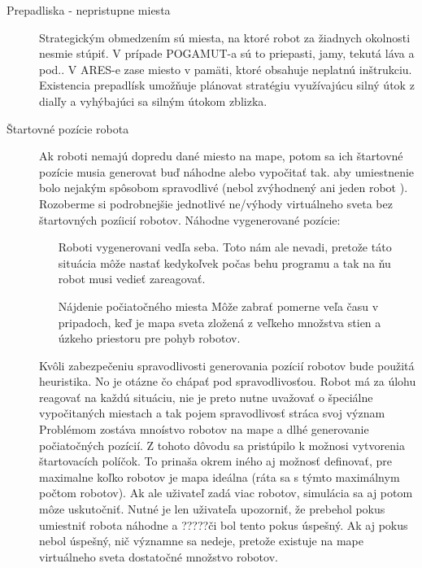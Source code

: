 \begin{description}
\newline
\item[Prepadliska - nepristupne miesta] \hfill
Strategickým obmedzením sú miesta, na ktoré robot za žiadnych okolnosti nesmie stúpiť. V prípade POGAMUT-a sú to priepasti, jamy, tekutá láva a pod.. V ARES-e zase miesto v pamäti, ktoré obsahuje neplatnú inštrukciu. Existencia prepadlísk umožňuje plánovat stratégiu využívajúcu silný útok z dialľy a vyhýbajúci sa silným útokom zblizka. 
\newline
\item[Štartovné pozície robota]\hfill
\newline
Ak roboti nemajú dopredu dané miesto na  mape, potom sa ich štartovné pozície musia generovat buď náhodne alebo vypočitať tak. aby umiestnenie bolo nejakým spôsobom spravodlivé (nebol zvýhodnený ani jeden robot ). Rozoberme si podrobnejšie jednotlivé ne/výhody virtuálneho sveta bez štartovných pozíicií robotov. Náhodne vygenerované pozície:
\begin{itemize}
\item[Roboti vygenerovani vedľa seba.] Toto nám ale nevadi, pretože táto situácia môže nastať kedykoľvek počas behu programu a tak na ňu robot musi vedieť zareagovať.
\item[Nájdenie počiatočného miesta] Môže zabrať pomerne veľa času v pripadoch, keď je mapa sveta zložená z veľkeho množstva stien a úzkeho priestoru pre pohyb robotov.
\end{itemize}
Kvôli zabezpečeniu spravodlivosti generovania pozícií robotov bude použitá heuristika. No je otázne čo chápať pod spravodlivosťou. Robot má za úlohu reagovať na každú situáciu, nie je preto nutne uvažovať o špeciálne vypočitaných miestach a tak pojem spravodlivosť stráca svoj význam\\
Problémom zostáva mnoístvo robotov na  mape a dlhé generovanie počiatočných pozícií. Z tohoto dôvodu sa pristúpilo k možnosi vytvorenia štartovacích políčok. To prinaša okrem iného aj možnosť definovať, pre maximalne koľko robotov je mapa ideálna (ráta sa s týmto maximálnym počtom robotov).  Ak ale uživateľ zadá viac robotov, simulácia sa aj potom môze uskutočniť.  Nutné je len uživateľa upozorniť, že prebehol pokus umiestniť robota náhodne a ?????či bol tento pokus úspešný. Ak aj pokus nebol úspešný, nič významne sa nedeje, pretože existuje na mape virtuálneho sveta dostatočné množstvo robotov.
\end{description}

